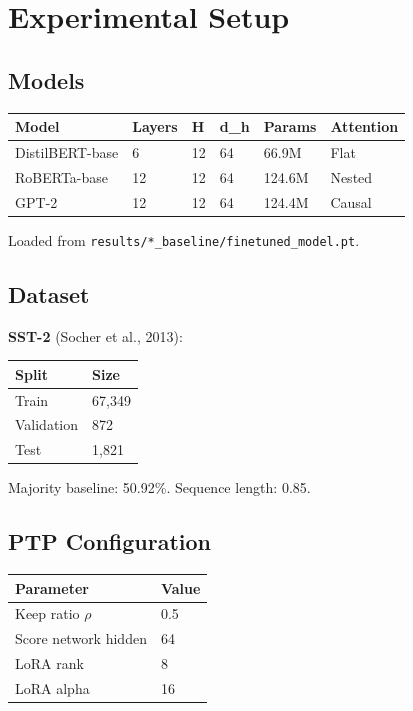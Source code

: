 
\section{Experimental Setup}

\subsection{Models}

\begin{table}[H]
\centering
\small
\begin{tabular}{llllll}
\toprule
\textbf{Model} & \textbf{Layers} & \textbf{H} & \textbf{d\_h} & \textbf{Params} & \textbf{Attention} \\
\midrule
DistilBERT-base & 6 & 12 & 64 & 66.9M & Flat \\
RoBERTa-base & 12 & 12 & 64 & 124.6M & Nested \\
GPT-2 & 12 & 12 & 64 & 124.4M & Causal \\
\bottomrule
\end{tabular}
\end{table}

Loaded from \texttt{results/*\_baseline/finetuned\_model.pt}.

\subsection{Dataset}

\textbf{SST-2} (Socher et al., 2013):

\begin{table}[H]
\centering
\small
\begin{tabular}{ll}
\toprule
\textbf{Split} & \textbf{Size} \\
\midrule
Train & 67,349 \\
Validation & 872 \\
Test & 1,821 \\
\bottomrule
\end{tabular}
\end{table}

Majority baseline: 50.92\%. Sequence length: 0.85.

\subsection{PTP Configuration}

\begin{table}[H]
\centering
\small
\begin{tabular}{ll}
\toprule
\textbf{Parameter} & \textbf{Value} \\
\midrule
Keep ratio $\rho$ & 0.5 \\
Score network hidden & 64 \\
LoRA rank & 8 \\
LoRA alpha & 16 \\
\bottomrule
\end{tabular}
\end{table}

